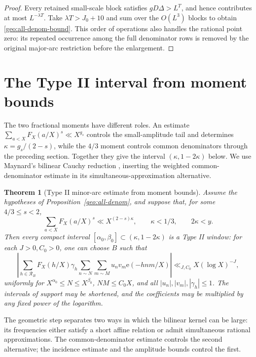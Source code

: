 \documentclass[11pt,a4paper]{article}
\theoremstyle{paperplain}
\newtheorem{theorem}{Theorem}[section]
\numberwithin{equation}{section}
\begin{document}
\begin{proof}
Every retained small-scale block satisfies $gD\Delta>L^T$, and hence
contributes at most $L^{-\lambda T}$.
Take $\lambda T>J_0+10$ and sum over the $O(L^3)$ blocks to obtain
\eqref{geo:all-denom-bound}.
This order of operations also handles the rational point zero:
its repeated occurrence among the full denominator rows is removed by the
original major-arc restriction before the enlargement.
\end{proof}

\section{The Type II interval from moment bounds}\label{geo:typeii-section}

The two fractional moments have different roles. An estimate
$\sum_{a<X}F_X(a/X)^s\ll X^{g_s}$ controls the small-amplitude tail
and determines $\kappa=g_s/(2-s)$, while the
$4/3$ moment controls common denominators through the preceding section.
Together they give the interval $(\kappa,1-2\kappa)$ below. We use
Maynard's bilinear Cauchy reduction \cite[\S13]{Maynard2019}, inserting
the weighted common-denominator estimate in its simultaneous-approximation
alternative.

\begin{theorem}[Type II minor-arc estimate from moment bounds]\label{geo:typeii}
Assume the hypotheses of Proposition~\ref{geo:all-denom}, and suppose that,
for some $4/3\le s<2$,
\begin{equation}\label{geo:fractional}
 \sum_{a<X}F_X(a/X)^s\ll X^{(2-s)\kappa},\qquad
 \kappa<1/3,\qquad 2\kappa<y.
\end{equation}
Then every compact interval
$[\alpha_0,\beta_0]\subset(\kappa,1-2\kappa)$
is a Type II window: for each $J>0,C_0>0$, one can choose $B$ such that
\begin{equation}\label{geo:typeii-bound}
 \left|\sum_{h\in\mathcal R_B}F_X(h/X)\gamma_h
 \sum_{n\sim N}\sum_{m\sim M}u_nv_m\mathrm e(-hnm/X)\right|
 \ll_{J,C_0}X(\log X)^{-J},
\end{equation}
uniformly for $X^{\alpha_0}\le N\le X^{\beta_0}$, $NM\le C_0X$,
and all $|u_n|,|v_m|,|\gamma_h|\le1$.
The intervals of support may be shortened, and the coefficients may be
multiplied by any fixed power of the logarithm.
\end{theorem}

The geometric step separates two ways in which the bilinear kernel can be
large: its frequencies either satisfy a short affine relation or admit
simultaneous rational approximations. The common-denominator estimate
controls the second alternative; the incidence estimate and the amplitude
bounds control the first.
\end{document}
